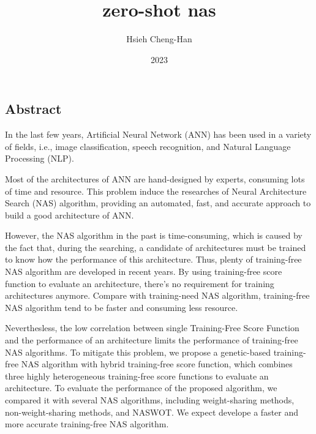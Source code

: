 \documentclass[twocolumn,10pt]{article}
\title{zero-shot nas}
\author{Hsieh Cheng-Han}
\date{2023}
\begin{document}
\begin{CJK*}{UTF8}{bsmi}

\maketitle

\section{Abstract}
In the last few years, Artificial Neural Network (ANN) has been used in a variety of fields, i.e., image classification, speech recognition, and Natural Language Processing (NLP).\par
Most of the architectures of ANN are hand-designed by experts, consuming lots of time and resource. This problem induce the researches of Neural Architecture Search (NAS) algorithm, providing an automated, fast, and accurate approach to build a good architecture of ANN.\par
However, the NAS algorithm in the past is time-consuming, which is caused by the fact that, during the searching, a candidate of architectures must be trained to know how the performance of this architecture. Thus, plenty of training-free NAS algorithm are developed in recent years. By using training-free score function to evaluate an architecture, there's no requirement for training architectures anymore. Compare with training-need NAS algorithm, training-free NAS algorithm tend to be faster and consuming less resource.\par
Neverthesless, the low correlation between single Training-Free Score Function and the performance of an architecture limits the performance of training-free NAS algorithms. To mitigate this problem, we propose a genetic-based training-free NAS algorithm with hybrid training-free score function, which combines three highly heterogeneous training-free score functions to evaluate an architecture. To evaluate the performance of the proposed algorithm, we compared it with several NAS algorithms, including weight-sharing methods, non-weight-sharing methods, and NASWOT. We expect develope a faster and more accurate training-free NAS algorithm.\par

\begin{thebibliography}{9}
\end{thebibliography}


\end{CJK*}
\end{document}
